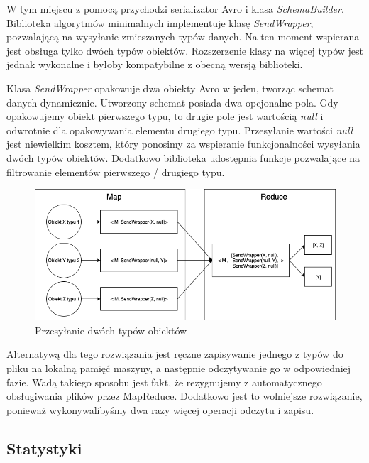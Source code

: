 \documentclass[licencjacka]{pracamgr}
\begin{document}
W tym miejscu z pomocą przychodzi serializator Avro i klasa \textit{SchemaBuilder}. Biblioteka algorytmów minimalnych implementuje klasę \textit{SendWrapper}, pozwalającą na wysyłanie zmieszanych typów danych. Na ten moment wspierana jest obsługa tylko dwóch typów obiektów. Rozszerzenie klasy na więcej typów jest jednak wykonalne i byłoby kompatybilne z obecną wersją biblioteki.

Klasa \textit{SendWrapper} opakowuje dwa obiekty Avro w jeden, tworząc schemat danych dynamicznie. Utworzony schemat posiada dwa opcjonalne pola. Gdy opakowujemy obiekt pierwszego typu, to drugie pole jest wartością \textit{null} i odwrotnie dla opakowywania elementu drugiego typu. Przesyłanie wartości \textit{null} jest niewielkim kosztem, który ponosimy za wspieranie funkcjonalności wysyłania dwóch typów obiektów. Dodatkowo biblioteka udostępnia funkcje pozwalające na filtrowanie elementów pierwszego / drugiego typu.

\begin{figure}[H]
    \caption{Przesyłanie dwóch typów obiektów}
    \includegraphics[width=15cm]{sending_multiple_typles.png}
\end{figure}

Alternatywą dla tego rozwiązania jest ręczne zapisywanie jednego z typów do pliku na lokalną pamięć maszyny, a następnie odczytywanie go w odpowiedniej fazie. Wadą takiego sposobu jest fakt, że rezygnujemy z automatycznego obsługiwania plików przez MapReduce. Dodatkowo jest to wolniejsze rozwiązanie, ponieważ wykonywalibyśmy dwa razy więcej operacji odczytu i zapisu.

\subsection{Statystyki}
\end{document}
